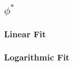 \documentclass{article}
\begin{document}
	\subsection{$\phi^{*}$}
		\subsubsection{Linear Fit}
		\begin{figure}[ht]
			\begin{center}
				
			\end{center}
		\end{figure}

		\subsubsection{Logarithmic Fit}
		\begin{figure}[ht]
			\begin{center}
				
			\end{center}
		\end{figure}
		
\end{document}
